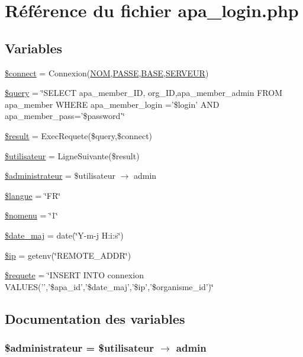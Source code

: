 \hypertarget{apa__login_8php}{
\section{R\'{e}f\'{e}rence du fichier apa\_\-login.php}
\label{apa__login_8php}
}
\subsection*{Variables}
\begin{CompactItemize}
\item 
\hyperlink{apa__login_8php_a0}{\$connect} = Connexion(\hyperlink{pma__connect_8php_a0}{NOM},\hyperlink{pma__connect_8php_a1}{PASSE},\hyperlink{pma__connect_8php_a3}{BASE},\hyperlink{pma__connect_8php_a2}{SERVEUR})
\item 
\hyperlink{apa__login_8php_a1}{\$query} = \char`\"{}SELECT apa\_\-member\_\-ID, org\_\-ID,apa\_\-member\_\-admin FROM apa\_\-member WHERE apa\_\-member\_\-login ='\$login' AND apa\_\-member\_\-pass='\$password'\char`\"{}
\item 
\hyperlink{apa__login_8php_a2}{\$result} = Exec\-Requete(\$query,\$connect)
\item 
\hyperlink{apa__login_8php_a3}{\$utilisateur} = Ligne\-Suivante(\$result)
\item 
\hyperlink{apa__login_8php_a4}{\$administrateur} = \$utilisateur $\rightarrow$ admin
\item 
\hyperlink{apa__login_8php_a5}{\$langue} = \char`\"{}FR\char`\"{}
\item 
\hyperlink{apa__login_8php_a6}{\$nomenu} = \char`\"{}1\char`\"{}
\item 
\hyperlink{apa__login_8php_a7}{\$date\_\-maj} = date(\char`\"{}Y-m-j H:i:s\char`\"{})
\item 
\hyperlink{apa__login_8php_a8}{\$ip} = getenv(\char`\"{}REMOTE\_\-ADDR\char`\"{})
\item 
\hyperlink{apa__login_8php_a9}{\$requete} = \char`\"{}INSERT INTO connexion VALUES('','\$apa\_\-id','\$date\_\-maj','\$ip','\$organisme\_\-id')\char`\"{}
\end{CompactItemize}


\subsection{Documentation des variables}
\hypertarget{apa__login_8php_a4}{
\subsubsection[\$administrateur]{\setlength{\rightskip}{0pt plus 5cm}\$administrateur = \$utilisateur $\rightarrow$ admin}}
\label{apa__login_8php_a4}


